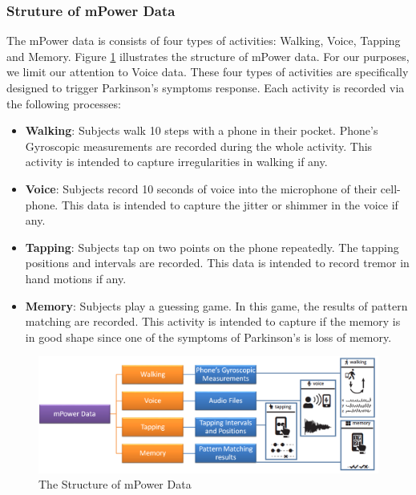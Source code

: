 \subsubsection{Struture of mPower Data}
The mPower data \cite{bot2016mpower} is consists of four types of activities: Walking, Voice, Tapping and Memory. Figure \ref{fig:park_flow} illustrates the structure of mPower data. For our purposes, we limit our attention to Voice data. These four types of activities are specifically designed to trigger Parkinson's symptoms response. Each activity is recorded via the following processes:
\begin{itemize}
\item \textbf{Walking}: Subjects walk 10 steps with a phone in their pocket. Phone's Gyroscopic measurements are recorded during the whole activity. This activity is intended to capture irregularities in walking if any.
\item \textbf{Voice}: Subjects record 10 seconds of voice into the microphone of their cell-phone. This data is intended to capture the jitter or shimmer in the voice if any.
\item \textbf{Tapping}: Subjects tap on two points on the phone repeatedly. The tapping positions and intervals are recorded. This data is intended to record tremor in hand motions if any.
\item \textbf{Memory}: Subjects play a guessing game. In this game, the results of pattern matching are recorded. This activity is intended to capture if the memory is in good shape since one of the symptoms of Parkinson's is loss of memory.
\end{itemize}
\begin{figure}[htbp]
  \centering
  \includegraphics[width=\textwidth]{./Figures/mpower_data.png}
  \caption{The Structure of mPower Data}
  \label{fig:park_flow}
\end{figure}

